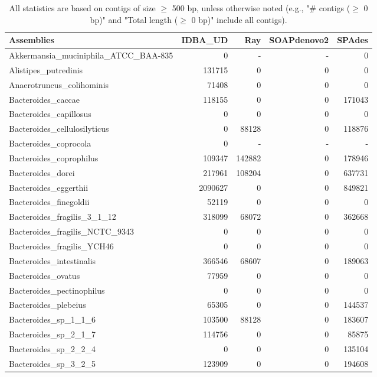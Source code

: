 \documentclass[12pt,a4paper]{article}
\begin{document}
\begin{table}[ht]
\begin{center}
\caption{All statistics are based on contigs of size $\geq$ 500 bp, unless otherwise noted (e.g., "\# contigs ($\geq$ 0 bp)" and "Total length ($\geq$ 0 bp)" include all contigs).}
\begin{tabular}{|l*{4}{|r}|}
\hline
Assemblies & IDBA\_UD & Ray & SOAPdenovo2 & SPAdes \\ \hline
Akkermansia\_muciniphila\_ATCC\_BAA-835 & 0 & - & - & 0 \\ \hline
Alistipes\_putredinis & 131715 & 0 & 0 & 0 \\ \hline
Anaerotruncus\_colihominis & 71408 & 0 & 0 & 0 \\ \hline
Bacteroides\_caccae & 118155 & 0 & 0 & 171043 \\ \hline
Bacteroides\_capillosus & 0 & 0 & 0 & 0 \\ \hline
Bacteroides\_cellulosilyticus & 0 & 88128 & 0 & 118876 \\ \hline
Bacteroides\_coprocola & 0 & - & - & - \\ \hline
Bacteroides\_coprophilus & 109347 & 142882 & 0 & 178946 \\ \hline
Bacteroides\_dorei & 217961 & 108204 & 0 & 637731 \\ \hline
Bacteroides\_eggerthii & 2090627 & 0 & 0 & 849821 \\ \hline
Bacteroides\_finegoldii & 52119 & 0 & 0 & 0 \\ \hline
Bacteroides\_fragilis\_3\_1\_12 & 318099 & 68072 & 0 & 362668 \\ \hline
Bacteroides\_fragilis\_NCTC\_9343 & 0 & 0 & 0 & 0 \\ \hline
Bacteroides\_fragilis\_YCH46 & 0 & 0 & 0 & 0 \\ \hline
Bacteroides\_intestinalis & 366546 & 68607 & 0 & 189063 \\ \hline
Bacteroides\_ovatus & 77959 & 0 & 0 & 0 \\ \hline
Bacteroides\_pectinophilus & 0 & 0 & 0 & 0 \\ \hline
Bacteroides\_plebeius & 65305 & 0 & 0 & 144537 \\ \hline
Bacteroides\_sp\_1\_1\_6 & 103500 & 88128 & 0 & 183607 \\ \hline
Bacteroides\_sp\_2\_1\_7 & 114756 & 0 & 0 & 85875 \\ \hline
Bacteroides\_sp\_2\_2\_4 & 0 & 0 & 0 & 135104 \\ \hline
Bacteroides\_sp\_3\_2\_5 & 123909 & 0 & 0 & 194608 \\ \hline

\end{tabular}
\end{center}
\end{table}
\end{document}
